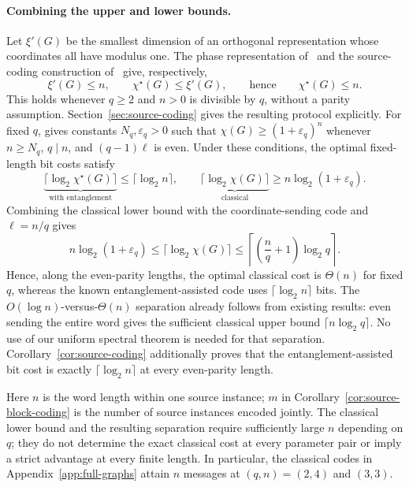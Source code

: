 \documentclass[11pt,a4paper]{article}
\numberwithin{equation}{section}
\numberwithin{figure}{section}
\numberwithin{table}{section}
\numberwithin{footnote}{section}
\theoremstyle{informal}\newtheorem*{informaltheorem}{Informal theorem}
\theoremstyle{definition}\newtheorem{example}{Example}[section]
\theoremstyle{remark}\newtheorem{remark}[theorem]{Remark}
\newcommand{\chs}{\chi^{\star}}
\begin{document}
\paragraph{Combining the upper and lower bounds.}
Let \(\xi'(G)\) be the smallest dimension of an orthogonal
representation whose coordinates all have modulus one. The phase
representation of~\cite[Lemma~4.1]{cao} and the source-coding
construction of~\cite[Lemma~5.1]{bblps} give, respectively,
\begin{equation}
 \xi'(G)\leq n,\qquad \chs(G)\leq\xi'(G),
 \qquad\text{hence}\qquad \chs(G)\leq n.
\end{equation}
This holds whenever \(q\geq2\) and \(n>0\) is divisible by \(q\),
without a parity assumption. Section~\ref{sec:source-coding} gives
the resulting protocol explicitly.
For fixed \(q\), \cite[Theorem~1.9]{cao} gives constants
\(N_q,\varepsilon_q>0\) such that
\(\chi(G)\geq(1+\varepsilon_q)^n\) whenever \(n\geq N_q\),
\(q\mid n\), and \((q-1)\ell\) is even. Under these conditions,
the optimal fixed-length bit costs satisfy
\begin{equation}
 \underbrace{\lceil\log_2\chs(G)\rceil}_{\text{with entanglement}}
 \leq\lceil\log_2 n\rceil,
 \qquad
 \underbrace{\lceil\log_2\chi(G)\rceil}_{\text{classical}}
 \geq n\log_2(1+\varepsilon_q).
\end{equation}
Combining the classical lower bound with the coordinate-sending code
and \(\ell=n/q\) gives
\begin{equation}
 n\log_2(1+\varepsilon_q)
 \leq\lceil\log_2\chi(G)\rceil
 \leq\left\lceil\left(\frac nq+1\right)\log_2 q\right\rceil.
\end{equation}
Hence, along the even-parity lengths, the optimal classical cost is
\(\Theta(n)\) for fixed \(q\),
whereas the known entanglement-assisted code uses
\(\lceil\log_2 n\rceil\) bits. The \(O(\log n)\)-versus-\(\Theta(n)\)
separation already follows from existing results: even sending
the entire word gives the sufficient classical upper bound
\(\lceil n\log_2 q\rceil\). No use of our uniform spectral theorem
is needed for that separation. Corollary~\ref{cor:source-coding}
additionally proves that the entanglement-assisted bit cost is
exactly \(\lceil\log_2 n\rceil\) at every even-parity length.

Here \(n\) is the word length within one source instance;
\(m\) in Corollary~\ref{cor:source-block-coding} is the number of
source instances encoded jointly. The classical lower bound
and the resulting separation require sufficiently large \(n\)
depending on \(q\); they do not determine the exact classical cost
at every parameter pair or imply a strict advantage at every finite
length. In particular, the classical codes in
Appendix~\ref{app:full-graphs} attain \(n\) messages at
\((q,n)=(2,4)\) and \((3,3)\).
\end{document}
